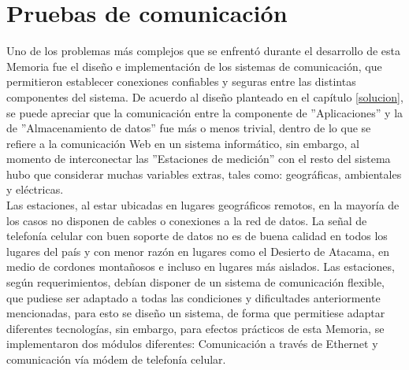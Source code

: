 \newpage
\section{Pruebas de comunicación}
Uno de los problemas más complejos que se enfrentó durante el desarrollo de esta Memoria fue el diseño e implementación de los sistemas de comunicación, que permitieron establecer conexiones confiables y seguras entre las distintas componentes del sistema. De acuerdo al diseño planteado en el capítulo \ref{solucion}, se puede apreciar que la comunicación entre la componente de ''Aplicaciones'' y la de ''Almacenamiento de datos'' fue más o menos trivial, dentro de lo que se refiere a la comunicación Web en un sistema informático, sin embargo, al momento de interconectar las ''Estaciones de medición'' con el resto del sistema hubo que considerar muchas variables extras, tales como: geográficas, ambientales y eléctricas.\\

Las estaciones, al estar ubicadas en lugares geográficos remotos, en la mayoría de los casos no disponen de cables o conexiones a la red de datos. La señal de telefonía celular con buen soporte de datos no es de buena calidad en todos los lugares del país y con menor razón en lugares como el Desierto de Atacama, en medio de cordones montañosos e incluso en lugares más aislados. Las estaciones, según requerimientos, debían disponer de un sistema de comunicación flexible, que pudiese ser adaptado a todas las condiciones y dificultades anteriormente mencionadas, para esto se diseño un sistema, de forma que permitiese adaptar diferentes tecnologías, sin embargo, para efectos prácticos de esta Memoria, se implementaron dos módulos diferentes: Comunicación a través de Ethernet y comunicación vía módem de telefonía celular.

